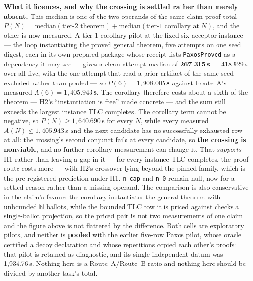 \documentclass[11pt,a4paper]{article}
\begin{document}
\textbf{What it licences, and why the crossing is settled rather than merely absent.} This median is one
of the two operands of the same-claim proof total $P(N) = \text{median}(\text{tier-2 theorem}) +
\text{median}(\text{tier-1 corollary at }N)$, and the other is now measured. A tier-1 corollary pilot at
the fixed six-acceptor instance --- the loop instantiating the proved general theorem, five attempts on one
seed digest, each in its own prepared package whose receipt lists \texttt{PaxosProved} as a dependency it
may see --- gives a clean-attempt median of \textbf{267.315\,s} --- 418.929\,s over all five, with the one
attempt that read a prior artifact of the same seed excluded rather than pooled --- so
\textbf{$P(6) = 1{,}908.005$\,s} against Route~A's measured \textbf{$A(6) = 1{,}405.943$\,s}. The corollary
therefore costs about a sixth of the theorem --- H2's ``instantiation is free'' made concrete --- and the
sum still exceeds the largest instance TLC completes. The corollary term cannot be negative, so $P(N) \ge 1{,}640.690$\,s for every $N$, while
every measured $A(N) \le 1{,}405.943$\,s and the next candidate has no successfully exhausted row at all:
the crossing's second conjunct fails at every candidate, so \textbf{the crossing is nonviable}, and no
further corollary measurement can change it. That \emph{supports} H1 rather than leaving a gap in it ---
for every instance TLC completes, the proof route costs more --- with H2's crossover lying beyond the
pinned family, which is the pre-registered prediction under H1. \texttt{n\_cap} and \texttt{n\_0} remain
null, now for a settled reason rather than a missing operand. The comparison is also conservative in the
claim's favour: the corollary instantiates the general theorem with unbounded $\mathbb{N}$ ballots, while
the bounded TLC row it is priced against checks a single-ballot projection, so the priced pair is not two
measurements of one claim and the figure above is not flattered by the difference. Both cells are
exploratory pilots, and neither is \textbf{pooled} with the earlier five-row Paxos pilot, whose oracle
certified a decoy declaration and whose repetitions copied each other's proofs: that pilot is retained as
diagnostic, and its single independent datum was 1{,}934.76\,s. Nothing here is a Route~A/Route~B ratio and
nothing here should be divided by another task's total.
\end{document}
